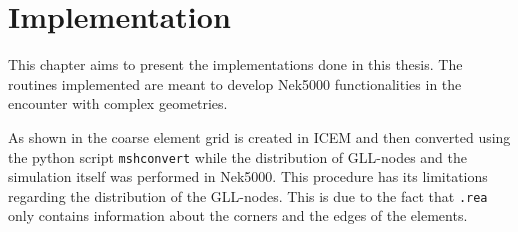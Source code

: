 
\chapter{Implementation} %

\label{implementation} %






This chapter aims to present the implementations done in this thesis. 
The routines implemented are meant to develop Nek5000 functionalities 
in the encounter with complex geometries. 

As shown in  the coarse element grid is created
in ICEM and then converted using the python script \verb|mshconvert| while the
distribution of GLL-nodes and the simulation itself was 
performed in Nek5000. This procedure has its limitations regarding the distribution of the GLL-nodes.
This is due to the fact that
\verb|.rea| only contains information about the corners and the edges of the elements. 



